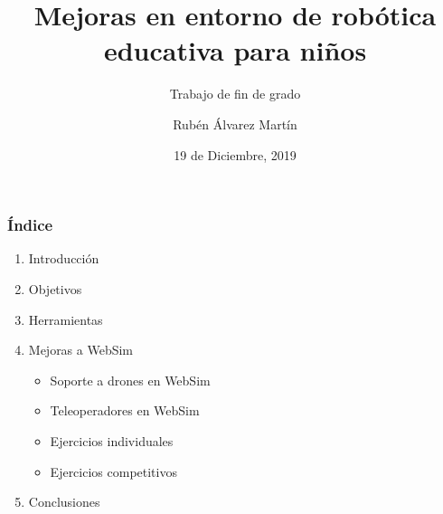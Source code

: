 \documentclass[xcolor={table}]{beamer}
\title{Mejoras en entorno de robótica  educativa para niños}
\subtitle{Trabajo de fin de grado}
\author{Rubén Álvarez Martín}
\date{19 de Diciembre, 2019}
\begin{document}
	\setcounter{showProgressBar}{0}
	\setcounter{showSlideNumbers}{0}

	\frame{\titlepage}

	\begin{frame}
		\frametitle{Índice}
		\begin{enumerate}
			\item Introducción  \textcolor{ExecusharesGrey}{}
		 \textcolor{ExecusharesGrey}{\footnotesize\hspace{0.5em}}
 		\item Objetivos  \textcolor{ExecusharesGrey}{}
		 \textcolor{ExecusharesGrey}{\footnotesize\hspace{0.5em}}
			\item Herramientas  \textcolor{ExecusharesGrey}{\footnotesize\hspace{0.5em}}
			\item Mejoras a WebSim  \textcolor{ExecusharesGrey}{
			\begin{itemize}
			    \item Soporte a drones en WebSim
			    \item Teleoperadores en WebSim
			    \item Ejercicios individuales
			    \item Ejercicios competitivos
			\end{itemize}} 
			\item Conclusiones  \textcolor{ExecusharesGrey}{\footnotesize\hspace{0.5em}}
		\end{enumerate}
	\end{frame}

	\setcounter{framenumber}{0}
	\setcounter{showProgressBar}{1}
	\setcounter{showSlideNumbers}{1}
\end{document}
